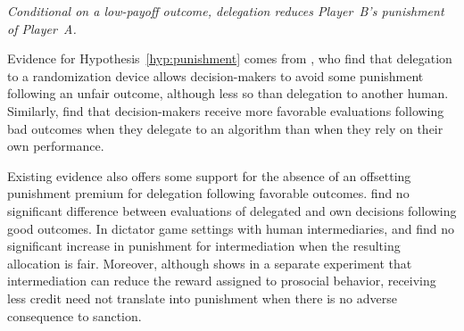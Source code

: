 \medskip
{} \textit{Conditional on a low-payoff outcome, delegation reduces Player~B's punishment of Player~A.}
\medskip


Evidence for Hypothesis~\ref{hyp:punishment} comes from \citet{bartling_shifting_2012}, who find that delegation to a randomization device allows decision-makers to avoid some punishment following an unfair outcome, although less so than delegation to another human. Similarly, \citet{feier_hiding_2022} find that decision-makers receive more favorable evaluations following bad outcomes when they delegate to an algorithm than when they rely on their own performance.


Existing evidence also offers some support for the absence of an offsetting punishment premium for delegation following favorable outcomes. \citet{feier_hiding_2022} find no significant difference between evaluations of delegated and own decisions following good outcomes. In dictator game settings with human intermediaries, \citet{bartling_shifting_2012} and \citet{coffman_intermediation_2011} find no significant increase in punishment for intermediation when the resulting allocation is fair. Moreover, although \citet{coffman_intermediation_2011} shows in a separate experiment that intermediation can reduce the reward assigned to prosocial behavior, receiving less credit need not translate into punishment when there is no adverse consequence to sanction. 

